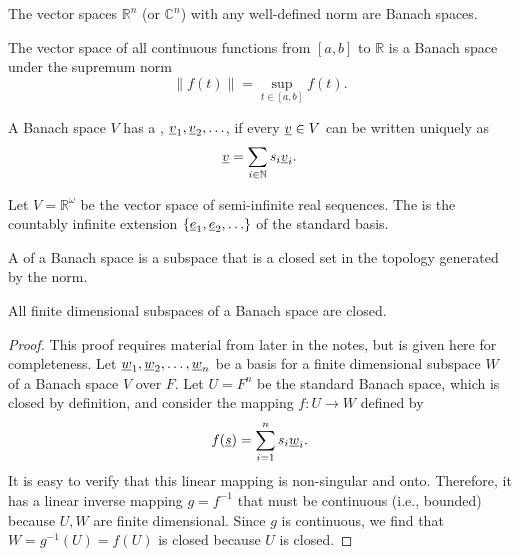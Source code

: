 \begin{example}
The vector spaces $\mathbb{R}^n$ (or $\mathbb{C}^n$) with any well-defined norm are Banach spaces.
\end{example}

\begin{example}
The vector space of all continuous functions from $[a,b]$ to $\mathbb{R}$ is a Banach space under the supremum norm
\[ \left\| f(t) \right\| = \sup_{t\in [a,b]} f(t). \]
\end{example}

\begin{definition}
A Banach space $V$ has a , $\underline{v}_1, \underline{v}_2, \ldots$, if every $\underline{v} \in V$ can be written uniquely as
\[ \underline{v} = \sum_{i\in \mathbb{N}} s_i \underline{v}_i. \]
\end{definition}

\begin{example}
Let $V = \mathbb{R}^\omega$ be the vector space of semi-infinite real sequences.
The  is the countably infinite extension $\{\underline{e}_1 ,\underline{e}_2, \ldots \}$ of the standard basis.
\end{example}

\begin{definition}
A  of a Banach space is a subspace that is a closed set in the topology generated by the norm.
\end{definition}

\begin{theorem}
All finite dimensional subspaces of a Banach space are closed.
\end{theorem}
\begin{proof}
This proof requires material from later in the notes, but is given here for completeness.
Let $\underline{w}_1,\underline{w}_2,\ldots,\underline{w}_n$ be a basis for a finite dimensional subspace $W$ of a Banach space $V$ over $F$.
Let $U = F^n$ be the standard Banach space, which is closed by definition, and consider the mapping $f: U\rightarrow W$ defined by
\[ f(\underline{s}) = \sum_{i=1}^n s_i \underline{w}_i. \]
It is easy to verify that this linear mapping is non-singular and onto.
Therefore, it has a linear inverse mapping $g = f^{-1}$ that must be continuous (i.e., bounded) because $U,W$ are finite dimensional.
Since $g$ is continuous, we find that $W = g^{-1}(U) = f(U)$ is closed because $U$ is closed.
\end{proof}

